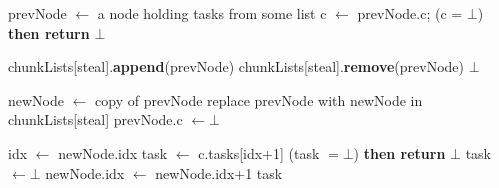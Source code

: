 \begin{algo}[!ht]
\begin{minipage}[t]{0.48\textwidth}
\begin{distribalgo}[1]
	\STATE prevNode $\leftarrow$ a node holding tasks from some list 
	\STATE c $\leftarrow$ prevNode.c;
   (c = $\bot$) {\bf then return} $\bot$

  \STATE chunkLists[steal].{\bf append}(prevNode)
 		\STATE chunkLists[steal].{\bf remove}(prevNode)
 		 $\bot$ 
	\ENDINDENT
	
	\smallskip
	\STATE newNode $\leftarrow$ copy of prevNode
	\STATE replace prevNode with newNode in chunkLists[steal]
	\STATE prevNode.c $\leftarrow \bot$ 
	
	\smallskip
	\STATE idx $\leftarrow$ newNode.idx
	\STATE task $\leftarrow$ c.tasks[idx+1] 
	 (task $= \bot$) {\bf then return} $\bot$ 
		\STATE task $\leftarrow \bot$
	\ENDINDENT
	\STATE newNode.idx $\leftarrow$ newNode.idx+1
	 task
\ENDINDENT

\setcounter{alg:non-fifo:lines}{\value{ALC@line}}
\end{distribalgo}
\end{minipage}
\end{algo}

